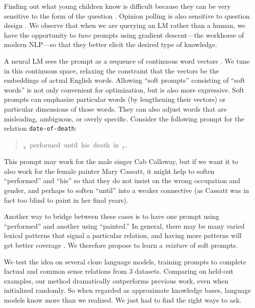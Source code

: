 Finding out what young children know is difficult because they can be very sensitive to the form of the question \cite{donaldsonChildrenMinds1978}.  Opinion polling is also sensitive to question design \citep{broughton1995assumptions}. We observe that when we are querying an LM rather than a human, we have the opportunity to \emph{tune} prompts using gradient descent---the workhorse of modern NLP---so that they better elicit the desired type of knowledge.  

A neural LM sees the prompt as a sequence of continuous word vectors \citep{baroniDonCountPredict2014}.  We tune in this continuous space, relaxing the constraint that the vectors be the embeddings of actual English words.  Allowing ``soft prompts'' consisting of ``soft words'' is not only convenient for optimization, but is also more expressive.  Soft prompts can emphasize particular words (by lengthening their vectors) or particular dimensions of those words.  They can also adjust words that are misleading, ambiguous, or overly specific.  Consider the following prompt for the relation \texttt{date-of-death}:

\begin{quote}
\mbox{\underline{}$\!_\mathrm{x}$ performed until his death in \underline{}$\!_\mathrm{y}$.}
\end{quote}

This prompt may work for the male singer Cab Calloway, but if we want it to also work for the female painter Mary Cassatt, it might help to soften ``performed'' and ``his'' so that they do not insist on the wrong occupation and gender, and perhaps to soften ``until'' into a weaker connective (as Cassatt was in fact too blind to paint in her final years).

Another way to bridge between these cases is to have one prompt using ``performed'' and another using ``painted.''  In general, there may be many varied lexical patterns that signal a particular relation, and having more patterns will get better coverage \cite{hearstAutomaticAcquisitionHyponyms1992,riloffLearningDictionariesInformation1999}.  We therefore propose to learn a \emph{mixture} of soft prompts.

We test the idea on several cloze language models, training prompts to complete factual and common sense relations from 3 datasets.  Comparing on held-out examples, our method dramatically outperforms previous work, even when initialized randomly.  So when regarded as approximate knowledge bases, language models know more than we realized.  We just had to find the right ways to ask.

